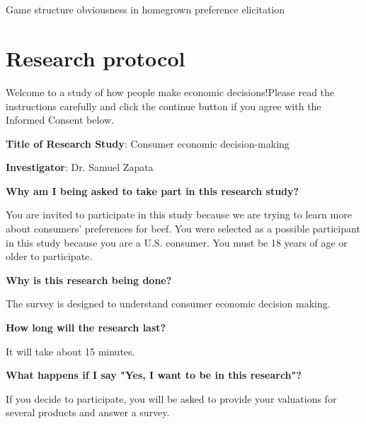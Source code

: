 \documentclass[12pt]{article}
\begin{document}



\newpage
	\singlespacing
	\appendix
	\setcounter{table}{0}
	\setcounter{figure}{0}
	\renewcommand{\thetable}{A\arabic{table}}
	\renewcommand{\thefigure}{A\arabic{figure}}
	\setcounter{page}{1}
	\renewcommand{\thesubsection}{\Alph{subsection}}

	\section*{}
	{\centering \LARGE Game structure obviousness in homegrown preference elicitation
		
		\vspace{0.5cm}
		\renewcommand*{\thefootnote}{\fnsymbol{footnote}}
		\setcounter{footnote}{0}
		
		\large
        }


        
\section{Research protocol}

Welcome to a study of how people make economic decisions!Please read the instructions carefully and click the continue button if you agree with the Informed Consent below.

\textbf{Title of Research Study}: Consumer economic decision-making

\textbf{Investigator}: Dr. Samuel Zapata

\textbf{Why am I being asked to take part in this research study?}

You are invited to participate in this study because we are trying to learn more about consumers' preferences for beef. You were selected as a possible participant in this study because you are a U.S. consumer. You must be 18 years of age or older to participate. \par
\textbf{Why is this research being done?} \par

The survey is designed to understand consumer economic decision making. \par

\textbf{How long will the research last?} \par
It will take about 15 minutes. \par
\textbf{What happens if I say "Yes, I want to be in this research"?} \par
If you decide to participate, you will be asked to provide your valuations for several products and answer a survey. \par
\end{document}
